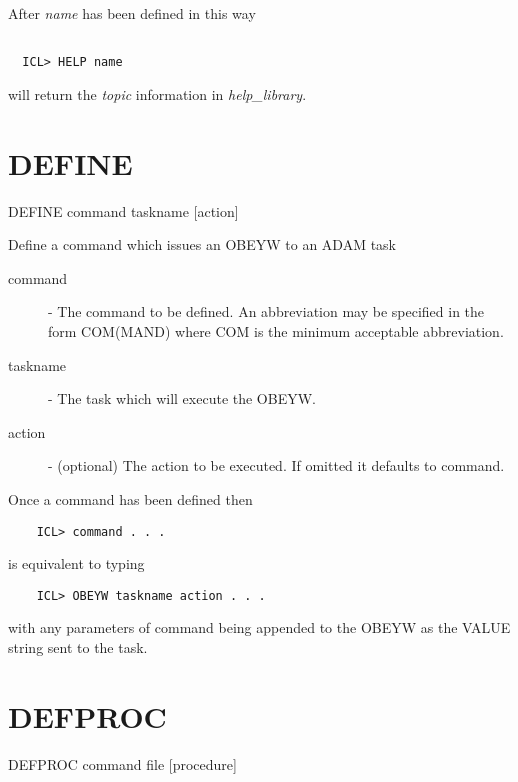 \documentclass[twoside,11pt]{report}
\newcommand{\xlabel}[1]{}
\begin{document}
After {\em name} has been defined in this way
\begin{verbatim}

  ICL> HELP name

\end{verbatim}
will return the {\em topic}  information in {\em help\_library}.

\section{\xlabel{DEFINE}DEFINE\label{DEFINE}}

   DEFINE \hspace{.5cm} command \hspace{.5cm} taskname \hspace{.5cm} [action]

 Define a command which issues an OBEYW to an ADAM task

\begin{description}

\item[command] - The command to be defined. An abbreviation
              may be specified in the form COM(MAND) where
              COM is the minimum acceptable abbreviation.

\item[taskname] - The task which will execute the OBEYW.

\item[action] - (optional)  The action to be executed. If
              omitted it defaults to command.

\end{description}
Once a command has been defined then
\begin{verbatim}
    ICL> command . . .
\end{verbatim}
is equivalent to typing
\begin{verbatim}
    ICL> OBEYW taskname action . . .
\end{verbatim}
with any parameters of command being appended to the OBEYW as the VALUE
string sent to the task.

\section{\xlabel{DEFPROC}DEFPROC\label{DEFPROC}}

   DEFPROC \hspace{.5cm} command \hspace{.5cm} file \hspace{.5cm} [procedure]
\end{document}
